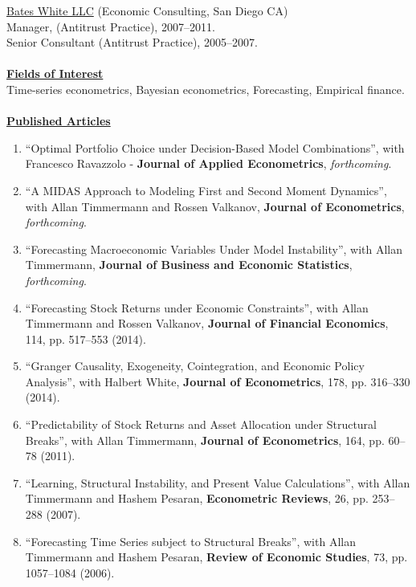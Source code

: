 \documentclass[12pt]{article}
\begin{document}
\underline{Bates White LLC} (Economic Consulting, San Diego CA)\\
Manager, (Antitrust Practice), 2007--2011.\\
Senior Consultant (Antitrust Practice), 2005--2007. \\ \\
\underline{\textbf{Fields of Interest}}\\
Time-series econometrics, Bayesian econometrics, Forecasting, Empirical finance.\\ \\
\underline{\textbf{Published Articles}}
\begin{enumerate}	

	\item ``Optimal Portfolio Choice under Decision-Based Model Combinations'', with Francesco Ravazzolo - \textbf{Journal of Applied Econometrics}, \textit{forthcoming}.
	
	\item ``A MIDAS Approach to Modeling First and Second Moment Dynamics'', with Allan Timmermann and Rossen Valkanov, \textbf{Journal of Econometrics}, \textit{forthcoming}.
	
  \item ``Forecasting Macroeconomic Variables Under Model Instability'', with Allan Timmermann, \textbf{Journal of Business and Economic Statistics},  \textit{forthcoming}. 
		
	\item ``Forecasting Stock Returns under Economic Constraints'', with Allan Timmermann and Rossen Valkanov, \textbf{Journal of Financial Economics}, 114, pp. 517--553 (2014).
	
	\item ``Granger Causality, Exogeneity, Cointegration, and Economic Policy Analysis'', with Halbert White, \textbf{Journal of Econometrics}, 178, pp. 316--330 (2014). 
	
	\item ``Predictability of Stock Returns and Asset Allocation under Structural Breaks'', with Allan Timmermann, \textbf{Journal of Econometrics}, 164, pp. 60--78 (2011). 
	
	\item ``Learning, Structural Instability, and Present Value Calculations'', with Allan Timmermann and Hashem Pesaran, \textbf{Econometric Reviews}, 26, pp. 253--288 (2007).

	\item ``Forecasting Time Series subject to Structural Breaks'', with Allan Timmermann and Hashem Pesaran, \textbf{Review of Economic Studies}, 73, pp. 1057--1084 (2006). 

    \setcounter{enumTemp}{\theenumi}
 \end{enumerate}
\end{document}
